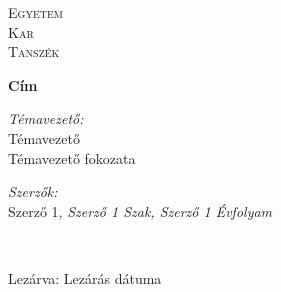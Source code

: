 %
%
%

\begin{titlepage}

\center

\textsc{\LARGE {{Egyetem}}}\\[1.5cm]
\textsc{\Large {{Kar}}}
\\[0.5cm]

\textsc{\large {{Tanszék}}}
\\[2.5cm]

{\huge \bfseries {{Cím}} \par}

\ifdefined\printName
  \vspace*{6.5cm}

  \begin{minipage}{.4\linewidth}
    \begin{flushleft}
      \large \textit{Témavezető:} \\
      {{Témavezető}} \\
      {{Témavezető fokozata}}
    \end{flushleft}
  \end{minipage}
  \hfill
  \begin{minipage}{.52\linewidth} 
    \begin{flushright}
      \large \textit{{Szerzők}:}\\
      {{Szerző 1}}, \textit{{{Szerző 1 Szak}}, {{Szerző 1 Évfolyam}}}
    \end{flushright}
  \end{minipage}
  \\[2.5cm]
\else
  \vspace*{10.5cm}
\fi

{\large Lezárva: {{Lezárás dátuma}}}\\ 

\vfill

\end{titlepage}
